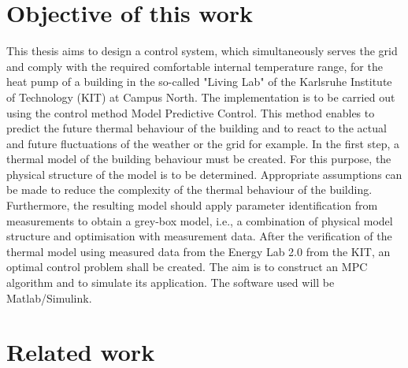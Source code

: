 \section{Objective of this work}
\label{section:obejective}
    This thesis aims to design a control system, which simultaneously serves the grid and comply with the required comfortable internal temperature range, for the heat pump of a building in the so-called "Living Lab" of the Karlsruhe Institute of Technology (KIT)  at Campus North. The implementation is to be carried out using the control method Model Predictive Control. This method enables to predict the future thermal behaviour of the building and to react to the actual and future fluctuations of the weather or the grid for example. 
    In the first step, a thermal model of the building behaviour must be created. For this purpose, the physical structure of the model is to be determined. Appropriate assumptions can be made to reduce the complexity of the thermal behaviour of the building. Furthermore, the resulting model should apply parameter identification from measurements to obtain a grey-box model, i.e., a combination of physical model structure and optimisation with measurement data. After the verification of the thermal model using measured data from the Energy Lab 2.0 from the KIT, an optimal control problem shall be created. The aim is to construct an MPC algorithm and to simulate its application. The software used will be Matlab/Simulink.

\section{Related work}
\label{section:relatedwork}

